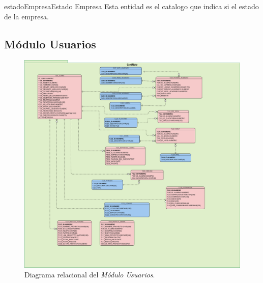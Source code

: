\begin{cdtEntidad}{estadoEmpresa}{Estado Empresa}{
    Esta entidad es el catalogo que indica si el estado de la empresa.
}

\end{cdtEntidad}

\clearpage
\subsection{Módulo Usuarios}

\begin{figure}[hbtp!]
    \begin{center}
        \includegraphics[width=1 \textwidth]{anexos/imagenes/MDUSR.png}
    \end{center}
    
    \caption{Diagrama relacional del \textit{Módulo Usuarios}.}
    \label{adcu:grl}
\end{figure}



